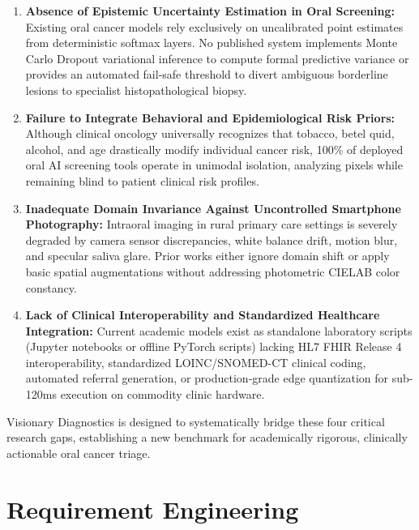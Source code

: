 \documentclass[12pt,a4paper,oneside]{report}
\begin{document}
\begin{enumerate}[label=\textbf{RG-\arabic*:}]
    \item \textbf{Absence of Epistemic Uncertainty Estimation in Oral Screening:} Existing oral cancer models rely exclusively on uncalibrated point estimates from deterministic softmax layers. No published system implements Monte Carlo Dropout variational inference to compute formal predictive variance or provides an automated fail-safe threshold to divert ambiguous borderline lesions to specialist histopathological biopsy.
    
    \item \textbf{Failure to Integrate Behavioral and Epidemiological Risk Priors:} Although clinical oncology universally recognizes that tobacco, betel quid, alcohol, and age drastically modify individual cancer risk, 100\% of deployed oral AI screening tools operate in unimodal isolation, analyzing pixels while remaining blind to patient clinical risk profiles.
    
    \item \textbf{Inadequate Domain Invariance Against Uncontrolled Smartphone Photography:} Intraoral imaging in rural primary care settings is severely degraded by camera sensor discrepancies, white balance drift, motion blur, and specular saliva glare. Prior works either ignore domain shift or apply basic spatial augmentations without addressing photometric CIELAB color constancy.
    
    \item \textbf{Lack of Clinical Interoperability and Standardized Healthcare Integration:} Current academic models exist as standalone laboratory scripts (Jupyter notebooks or offline PyTorch scripts) lacking HL7 FHIR Release 4 interoperability, standardized LOINC/SNOMED-CT clinical coding, automated referral generation, or production-grade edge quantization for sub-120ms execution on commodity clinic hardware.
\end{enumerate}

Visionary Diagnostics is designed to systematically bridge these four critical research gaps, establishing a new benchmark for academically rigorous, clinically actionable oral cancer triage.



\chapter{Requirement Engineering}
\label{ch:requirement_engineering}
\end{document}

